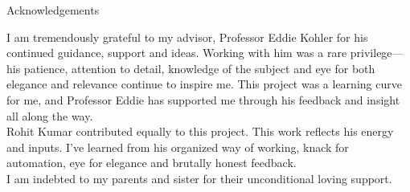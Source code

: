 \begin{center}
{\large Acknowledgements}
\end{center}

I am tremendously grateful to my advisor, Professor Eddie Kohler for
his continued guidance, support and ideas. Working with him was a rare privilege---his patience, attention to detail, knowledge of the subject and eye for both elegance and relevance continue to inspire me. This project was a learning curve for me, and Professor Eddie has supported me
through his feedback and insight all along the way.\\

Rohit Kumar contributed equally to this project. This work reflects his energy and inputs. I've learned from his organized way of working, knack for automation, eye for elegance and brutally honest feedback.\\

I am indebted to my parents and sister for their unconditional loving support.

